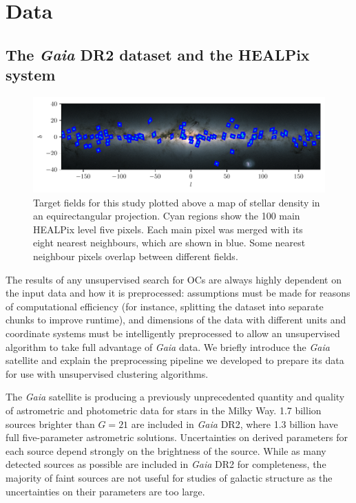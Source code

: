 

\section{Data}\label{c2:sec:data}
\subsection{The \emph{Gaia} DR2 dataset and the HEALPix system}

\begin{figure}
   \centering
   \includegraphics[width=\textwidth]{fig/c2/fig_fields.pdf}
   \caption{Target fields for this study plotted above a  \emph{} map of stellar density in an equirectangular projection. Cyan regions show the 100 main HEALPix level five pixels. Each main pixel was merged with its eight nearest neighbours, which are shown in blue. Some nearest neighbour pixels overlap between different fields.}\label{c2:fig:targetfields}%
\end{figure}

The results of any unsupervised search for OCs are always highly dependent on the input data and how it is preprocessed: assumptions must be made for reasons of computational efficiency (for instance, splitting the dataset into separate chunks to improve runtime), and dimensions of the data with different units and coordinate systems must be intelligently preprocessed to allow an unsupervised algorithm to take full advantage of \emph{Gaia} data. We briefly introduce the \emph{Gaia} satellite and explain the preprocessing pipeline we developed to prepare its data for use with unsupervised clustering algorithms.

The \emph{Gaia} satellite is producing a previously unprecedented quantity and quality of astrometric and photometric data for stars in the Milky Way. 1.7 billion sources brighter than $G=21$ are included in \emph{Gaia} DR2, where 1.3 billion have full five-parameter astrometric solutions. Uncertainties on derived parameters for each source depend strongly on the brightness of the source. While as many detected sources as possible are included in \emph{Gaia} DR2 for completeness, the majority of faint sources are not useful for studies of galactic structure as the uncertainties on their parameters are too large. 

